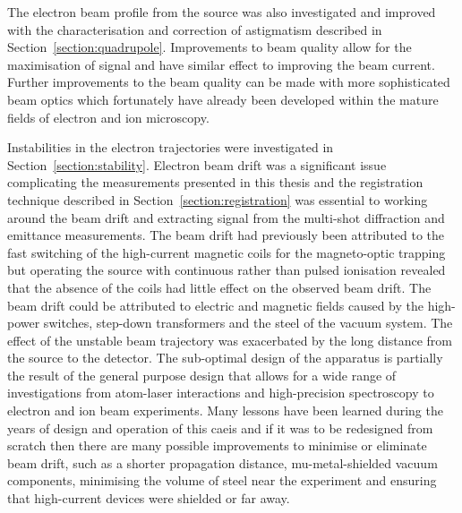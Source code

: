 The electron beam profile from the source was also investigated and improved with the characterisation and correction of astigmatism described in Section~\ref{section:quadrupole}.
Improvements to beam quality allow for the maximisation of signal and have similar effect to improving the beam current.
Further improvements to the beam quality can be made with more sophisticated beam optics which fortunately have already been developed within the mature fields of electron and ion microscopy.

Instabilities in the electron trajectories were investigated in Section~\ref{section:stability}.
Electron beam drift was a significant issue complicating the measurements presented in this thesis and the registration technique described in Section~\ref{section:registration} was essential to working around the beam drift and extracting signal from the multi-shot diffraction and emittance measurements.
The beam drift had previously been attributed to the fast switching of the high-current magnetic coils for the magneto-optic trapping but operating the source with continuous rather than pulsed ionisation revealed that the absence of the coils had little effect on the observed beam drift.
The beam drift could be attributed to electric and magnetic fields caused by the high-power switches, step-down transformers and the steel of the vacuum system.
The effect of the unstable beam trajectory was exacerbated by the long distance from the source to the detector.
The sub-optimal design of the apparatus is partially the result of the general purpose design that allows for a wide range of investigations from atom-laser interactions and high-precision spectroscopy to electron and ion beam experiments.
Many lessons have been learned during the years of design and operation of this \gls{caeis} and if it was to be redesigned from scratch then there are many possible improvements to minimise or eliminate beam drift, such as a shorter propagation distance, mu-metal-shielded vacuum components, minimising the volume of steel near the experiment and ensuring that high-current devices were shielded or far away.

